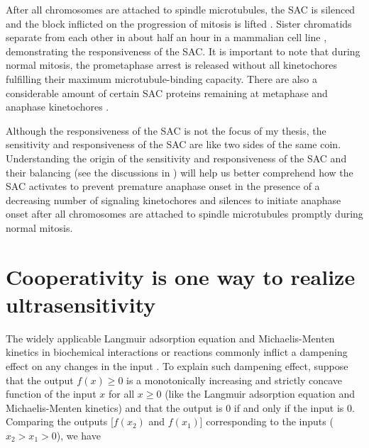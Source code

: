After all chromosomes are attached to spindle microtubules, the SAC is silenced and the block inflicted on the progression of mitosis is lifted \cite{PP2A-B56, DyneinStripsCorona, BubR1MitosisTurnover, CCT-MCCDisassembly, Ubiquitylation-MCCDisassembly, UBR5-MCCDisassembly, TRIP13-p31-MAD2, APC-SUMO}. Sister chromatids separate from each other in about half an hour in a mammalian cell line \cite{RiederNormalProgression}, demonstrating the responsiveness of the SAC. It is important to note that during normal mitosis, the prometaphase arrest is released without all kinetochores fulfilling their maximum microtubule-binding capacity. There are also a considerable amount of certain SAC proteins remaining at metaphase and anaphase kinetochores \cite{SACSilencing_Etemad2019, SACSilencing_Kuhn2019}.


Although the responsiveness of the SAC is not the focus of my thesis, the sensitivity and responsiveness of the SAC are like two sides of the same coin. Understanding the origin of the sensitivity and responsiveness of the SAC and their balancing (see the discussions in ) will help us better comprehend how the SAC activates to prevent premature anaphase onset in the presence of a decreasing number of signaling kinetochores and silences to initiate anaphase onset after all chromosomes are attached to spindle microtubules promptly during normal mitosis.

\section{Cooperativity is one way to realize ultrasensitivity}

The widely applicable Langmuir adsorption equation and Michaelis-Menten kinetics in biochemical interactions or reactions commonly inflict a dampening effect on any changes in the input \cite{CooperativityQA}. To explain such dampening effect, suppose that the output $f(x) \geq 0$ is a monotonically increasing and strictly concave function of the input $x$ for all $x \geq 0$ (like the Langmuir adsorption equation and Michaelis-Menten kinetics) and that the output is 0 if and only if the input is 0. Comparing the outputs [$f(x_2)$ and $f(x_1)$] corresponding to the inputs ($x_2 > x_1 > 0$), we have

